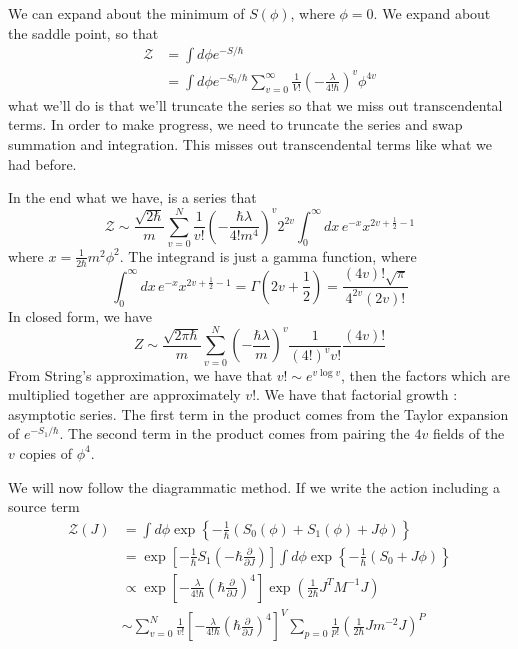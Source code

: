 \documentclass[11pt, oneside]{article}   	%
\theoremstyle{slanted}
\begin{document}
We can expand about the minimum of $ S \left( \phi  \right)  $, 
where $ \phi  = 0 $. 
We expand about the saddle point, so that 
\begin{align*}
\mathcal{ Z } &=  \int d \phi e ^{  - S / \hbar }  \\
&=  \int d \phi e ^{  - S_0 / \hbar } \sum_{ v  = 0  } ^{ \infty } 
\frac{1}{ V! } \left(  - \frac{\lambda}{4 !  \hbar }  \right) ^{ v } \phi ^{ 4 v } 
\end{align*}
what we'll do is that we'll truncate the series 
so that we miss out transcendental terms. 
In order to make progress, we need to 
truncate the series and swap summation and integration. 
This misses out transcendental terms 
like what we had before.  

In the end what we have, is a series that 
\[
\mathcal{ Z } \sim \frac{\sqrt{ 2 \hbar }  }{ m } \sum_{ v = 0 }^{ N } \frac{1}{v ! } 
\left(  - \frac{\hbar \lambda }{ 4 ! m ^ 4   }  \right)^ v 2 ^{ 2v } 
\int _ 0 ^ \infty d x \, e ^{ - x } x^{ 2v + \frac{1}{2 }  - 1 } 
\]  where $ x  = \frac{1}{ 2 \hbar } m ^ 2 \phi ^ 2 $. 
The integrand is just a gamma function, where 
\[
\int _ 0 ^{ \infty } dx \, e ^{ - x } x ^{ 2 v + \frac{1}{2 } - 1 } 
= \Gamma \left(  2v + \frac{1}{2 }  \right)   = \frac{ \left( 4v  \right)  ! 
\sqrt{ \pi }  }{ 4 ^{ 2v } \left( 2v  \right)  ! }
\] In closed form, we have 
\[
Z \sim \frac{ \sqrt{ 2 \pi \hbar }  }{ m } 
\sum _{ v = 0 }^{ N } \left(  - \frac{ \hbar \lambda  }{ m }  \right)^{ v } 
\frac{1}{\left( 4 !  \right)  ^{ v } v ! } \frac{\left( 4v   \right) ! }{ }
\] From String's approximation, 
we have that $ v ! \sim e ^{ v \log v } $, 
then the factors which are multiplied together 
are approximately $ v ! $. 
We have that factorial growth : asymptotic series. 
The first term in the 
product comes from the Taylor expansion of $ e ^{  - S _ 1  / \hbar  } $. 
The second term in the product comes from pairing 
the $ 4 v $ fields of the $ v $ copies of $ \phi ^ 4 $. 

We will now follow the diagrammatic 
method. 
If we write the action 
including a source term 
\begin{align*}
\mathcal{ Z } \left( J  \right)  & = \int d \phi  \exp \left\{  
-\frac{1}{\hbar } \left( S _ 0 \left( \phi  \right)  + S _ 1 \left( \phi  \right)  
+ J \phi \right)   \right\} \\
				 &=  \exp \left[  - \frac{1}{\hbar } S_ 1 \left(  - \hbar \frac{\partial }{\partial  J }  \right)  \right] \int 
				 d \phi \exp \left\{  
				 - \frac{1}{\hbar } \left( 
			 S_ 0 + J \phi \right) \right\} \\
			 & \propto 
			 \exp \left[  
			 - \frac{ \lambda  }{ 4 ! \hbar } \left( 
		 \hbar \frac{\partial  }{\partial  J }  \right)  ^ 4 \right]
		 \exp \left( \frac{1}{ 2 \hbar  } J ^ T 
		 M ^{ - 1 } J \right) \\
		 & \sim \sum_{ v  =0 } ^ N \frac{1}{ v ! } 
		 \left[   - \frac{ \lambda }{ 4 ! \hbar } \left( 
		 \hbar \frac{\partial  }{\partial  J }   \right) ^ 4   \right] ^ V 
		 \sum_{ p = 0  } \frac{1}{p !  } \left( \frac{1}{ 2 \hbar } J m ^{ - 2 }  J \right) ^ P  
\end{align*}
\end{document}
